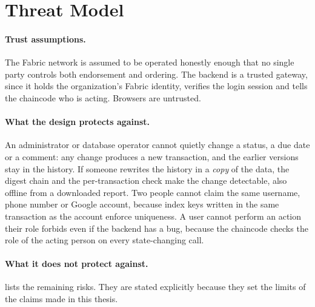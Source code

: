 \section{Threat Model}
\label{sec:results-threats}

\paragraph{Trust assumptions.} The Fabric network is assumed to be operated honestly enough that no single party controls both endorsement and ordering. The backend is a trusted gateway, since it holds the organization's Fabric identity, verifies the login session and tells the chaincode who is acting. Browsers are untrusted.

\paragraph{What the design protects against.} An administrator or database operator cannot quietly change a status, a due date or a comment: any change produces a new transaction, and the earlier versions stay in the history. If someone rewrites the history in a \emph{copy} of the data, the digest chain and the per-transaction check make the change detectable, also offline from a downloaded report. Two people cannot claim the same username, phone number or Google account, because index keys written in the same transaction as the account enforce uniqueness. A user cannot perform an action their role forbids even if the backend has a bug, because the chaincode checks the role of the acting person on every state-changing call.

\paragraph{What it does not protect against.}  lists the remaining risks. They are stated explicitly because they set the limits of the claims made in this thesis.

